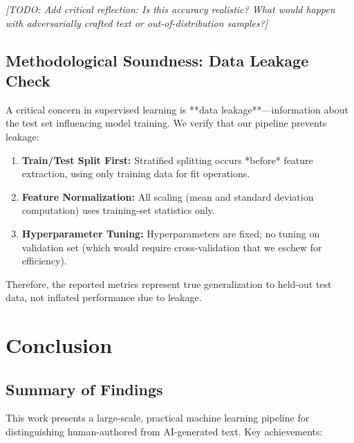 \documentclass[12pt, a4paper]{article}
\begin{document}
\textit{[TODO: Add critical reflection: Is this accuracy realistic? What would happen with adversarially crafted text or out-of-distribution samples?]}

\subsection{Methodological Soundness: Data Leakage Check}

A critical concern in supervised learning is **data leakage**—information about the test set influencing model training. We verify that our pipeline prevents leakage:

\begin{enumerate}
    \item \textbf{Train/Test Split First:} Stratified splitting occurs *before* feature extraction, using only training data for fit operations.
    \item \textbf{Feature Normalization:} All scaling (mean and standard deviation computation) uses training-set statistics only.
    \item \textbf{Hyperparameter Tuning:} Hyperparameters are fixed; no tuning on validation set (which would require cross-validation that we eschew for efficiency).
\end{enumerate}

Therefore, the reported metrics represent true generalization to held-out test data, not inflated performance due to leakage.

\section{Conclusion}

\subsection{Summary of Findings}

This work presents a large-scale, practical machine learning pipeline for distinguishing human-authored from AI-generated text. Key achievements:
\end{document}
